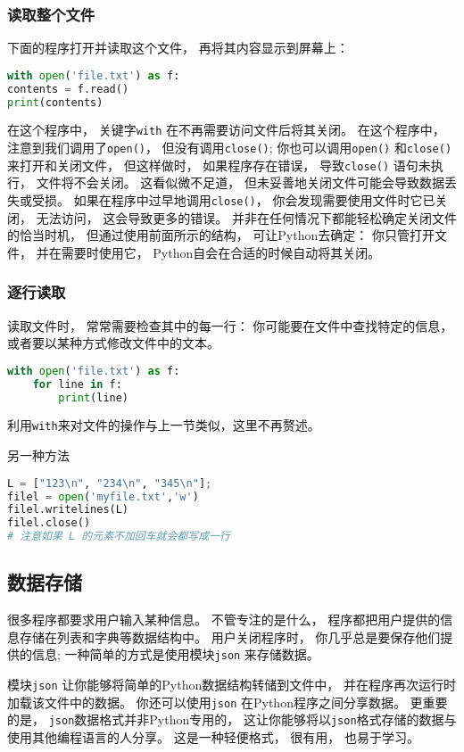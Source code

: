\subsubsection{读取整个文件}
下面的程序打开并读取这个文件， 再将其内容显示到屏幕上：
\begin{lstlisting}[language=python]
with open('file.txt') as f:
contents = f.read()
print(contents)
\end{lstlisting}
在这个程序中， 关键字\verb|with| 在不再需要访问文件后将其关闭。 在这个程序中， 注意到我们调用了\verb|open()|， 但没有调用\verb|close()|; 你也可以调用\verb|open()| 和\verb|close()| 来打开和关闭文件， 但这样做时， 如果程序存在错误， 导致\verb|close()| 语句未执行， 文件将不会关闭。 这看似微不足道， 但未妥善地关闭文件可能会导致数据丢失或受损。 如果在程序中过早地调用\verb|close()|， 你会发现需要使用文件时它已关闭， 无法访问， 这会导致更多的错误。 并非在任何情况下都能轻松确定关闭文件的恰当时机， 但通过使用前面所示的结构， 可让Python去确定： 你只管打开文件， 并在需要时使用它， Python自会在合适的时候自动将其关闭。

\subsubsection{逐行读取}
读取文件时， 常常需要检查其中的每一行： 你可能要在文件中查找特定的信息， 或者要以某种方式修改文件中的文本。
\begin{lstlisting}[language=python]
with open('file.txt') as f:
    for line in f:
        print(line)
\end{lstlisting}

利用\verb|with|来对文件的操作与上一节类似，这里不再赘述。

另一种方法
\begin{lstlisting}[language=python]
L = ["123\n", "234\n", "345\n"];
filel = open('myfile.txt','w')
filel.writelines(L)
filel.close()
# 注意如果 L 的元素不加回车就会都写成一行
\end{lstlisting}

\subsection{数据存储}
很多程序都要求用户输入某种信息。 不管专注的是什么， 程序都把用户提供的信息存储在列表和字典等数据结构中。  用户关闭程序时， 你几乎总是要保存他们提供的信息; 一种简单的方式是使用模块\verb|json| 来存储数据。

模块\verb|json| 让你能够将简单的Python数据结构转储到文件中， 并在程序再次运行时加载该文件中的数据。 你还可以使用\verb|json| 在Python程序之间分享数据。 更重要的是， \verb|json|数据格式并非Python专用的， 这让你能够将以\verb|json|格式存储的数据与使用其他编程语言的人分享。 这是一种轻便格式， 很有用， 也易于学习。

